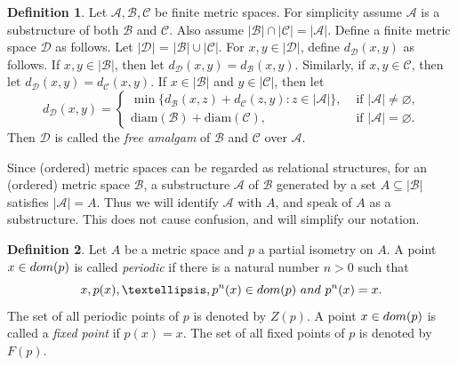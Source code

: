 \documentclass{amsart}
\theoremstyle{definition}
\newtheorem{definition}{Definition}[section]
\theoremstyle{remark}
\begin{document}
\begin{definition} Let $\mathcal{A}, \mathcal{B}, \mathcal{C}$ be finite metric spaces.  For simplicity assume $\mathcal{A}$ is a substructure of both $\mathcal{B}$ and $\mathcal{C}$. Also assume $|\mathcal{B}|\cap |\mathcal{C}|=|\mathcal{A}|$. Define a finite metric space $\mathcal{D}$ as follows. Let $|\mathcal{D}|$ = $|\mathcal{B}| \cup |\mathcal{C}|$. For $x,y\in |\mathcal{D}|$, define $d_{\mathcal{D}}(x,y)$ as follows. If $x,y \in |\mathcal{B}|$, then let $d_{\mathcal{D}}(x,y)=d_{\mathcal{B}}(x,y)$. Similarly, if $x,y\in \mathcal{C}$, then let $d_{\mathcal{D}}(x,y)=d_{\mathcal{C}}(x,y)$. If $x\in |\mathcal{B}|$ and $y\in |\mathcal{C}|$, then let
    \begin{equation*}
        d_{\mathcal{D}}(x,y)= \left \{
            \begin{array}{ll}
                \min\{d_\mathcal{B}(x,z)+d_\mathcal{C}(z,y)\colon  z\in |\mathcal{A}|\}, & \mbox{ if $|\mathcal{A}| \neq \varnothing$,} \\
                \mbox{diam}(\mathcal{B})+\mbox{diam}(\mathcal{C}),  & \mbox{ if $|\mathcal{A}| = \varnothing$.}
            \end{array}\right .
    \end{equation*}
Then $\mathcal{D}$ is called the {\em free amalgam} of $\mathcal{B}$ and $\mathcal{C}$ over $\mathcal{A}$.
\end{definition}

Since (ordered) metric spaces can be regarded as relational structures, for an (ordered) metric space $\mathcal{B}$, a substructure $\mathcal{A}$ of $\mathcal{B}$ generated by a set $A\subseteq |\mathcal{B}|$ satisfies $|\mathcal{A}|=A$. Thus we will identify $\mathcal{A}$ with $A$, and speak of $A$ as a substructure. This does not cause confusion, and will simplify our notation.

    \begin{definition}
        Let $A$ be a metric space and $p$ a partial isometry on $A$. A point $x \in {\rm dom}(p)$ is called {\em periodic} if there is a natural number $n>0$ such that \[x,p(x),\dots,p^n(x)\in {\rm dom}(p) \ {\rm and} \ p^n(x)=x.\] The set of all periodic points of $p$ is denoted by $Z(p)$. A point $x \in {\rm dom}(p)$ is called a {\em fixed point} if $p(x)=x$. The set of all fixed points of $p$ is denoted by $F(p)$. 
    \end{definition}
\end{document}
